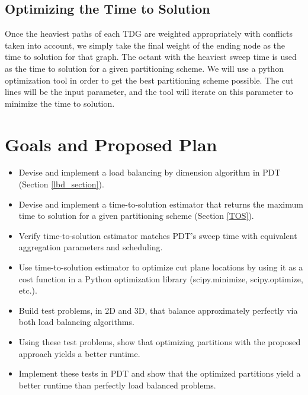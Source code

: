 \documentclass[11pt, letterpaper,titlepage,oneside]{article}
\begin{document}
\subsection{Optimizing the Time to Solution}\label{optimize}

Once the heaviest paths of each TDG are weighted appropriately with conflicts taken into account, we simply take the final weight of the ending node as the time to solution for that graph. The octant with the heaviest sweep time is used as the time to solution for a given partitioning scheme. We will use a python optimization tool in order to get the best partitioning scheme possible. The cut lines will be the input parameter, and the tool will iterate on this parameter to minimize the time to solution. 

\section{Goals and Proposed Plan}

\begin{itemize}
\item Devise and implement a load balancing by dimension algorithm in PDT (Section \ref{lbd_section}).
\item Devise and implement a time-to-solution estimator that returns the maximum time to solution for a given partitioning scheme (Section \ref{TOS}).
\item Verify time-to-solution estimator matches PDT's sweep time with equivalent aggregation parameters and scheduling.
\item Use time-to-solution estimator to optimize cut plane locations by using it as a cost function in a Python optimization library (scipy.minimize, scipy.optimize, etc.). 
\item Build test problems, in 2D and 3D, that balance approximately perfectly via both load balancing algorithms.
\item Using these test problems, show that optimizing partitions with the proposed approach yields a better runtime.
\item Implement these tests in PDT and show that the optimized partitions yield a better runtime than perfectly load balanced problems.
\end{itemize}




\end{document}
